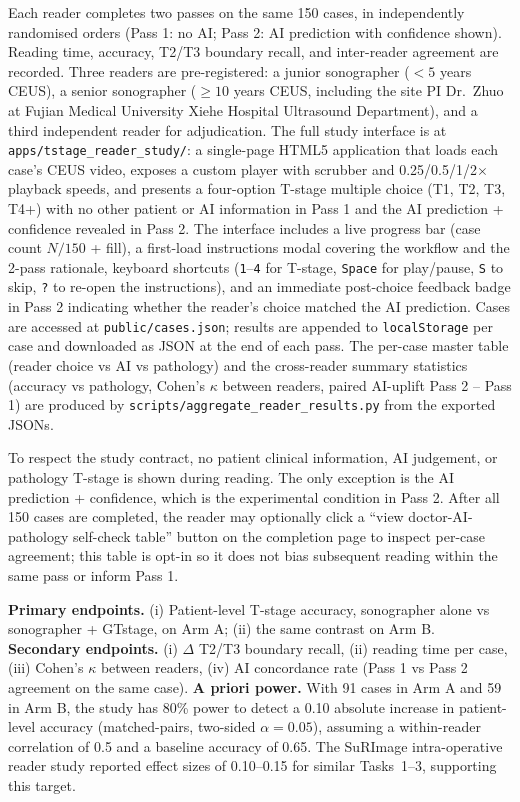 \documentclass[11pt,a4paper]{article}
\begin{document}
Each reader completes two passes on the same 150 cases, in independently randomised orders (Pass 1: no AI; Pass 2: AI prediction with confidence shown). Reading time, accuracy, T2/T3 boundary recall, and inter-reader agreement are recorded. Three readers are pre-registered: a junior sonographer ($<5$ years CEUS), a senior sonographer ($\geq 10$ years CEUS, including the site PI Dr.~Zhuo at Fujian Medical University Xiehe Hospital Ultrasound Department), and a third independent reader for adjudication. The full study interface is at \texttt{apps/tstage\_reader\_study/}: a single-page HTML5 application that loads each case's CEUS video, exposes a custom player with scrubber and 0.25/0.5/1/2$\times$ playback speeds, and presents a four-option T-stage multiple choice (T1, T2, T3, T4+) with no other patient or AI information in Pass 1 and the AI prediction + confidence revealed in Pass 2. The interface includes a live progress bar (case count $N/150$ + fill), a first-load instructions modal covering the workflow and the 2-pass rationale, keyboard shortcuts (\texttt{1}--\texttt{4} for T-stage, \texttt{Space} for play/pause, \texttt{S} to skip, \texttt{?} to re-open the instructions), and an immediate post-choice feedback badge in Pass 2 indicating whether the reader's choice matched the AI prediction. Cases are accessed at \texttt{public/cases.json}; results are appended to \texttt{localStorage} per case and downloaded as JSON at the end of each pass. The per-case master table (reader choice vs AI vs pathology) and the cross-reader summary statistics (accuracy vs pathology, Cohen's $\kappa$ between readers, paired AI-uplift Pass 2 -- Pass 1) are produced by \texttt{scripts/aggregate\_reader\_results.py} from the exported JSONs.

To respect the study contract, no patient clinical information, AI judgement, or pathology T-stage is shown during reading. The only exception is the AI prediction + confidence, which is the experimental condition in Pass 2. After all 150 cases are completed, the reader may optionally click a ``view doctor-AI-pathology self-check table'' button on the completion page to inspect per-case agreement; this table is opt-in so it does not bias subsequent reading within the same pass or inform Pass 1.

\textbf{Primary endpoints.} (i) Patient-level T-stage accuracy, sonographer alone vs sonographer + GTstage, on Arm A; (ii) the same contrast on Arm B. \textbf{Secondary endpoints.} (i) $\Delta$ T2/T3 boundary recall, (ii) reading time per case, (iii) Cohen's $\kappa$ between readers, (iv) AI concordance rate (Pass 1 vs Pass 2 agreement on the same case). \textbf{A priori power.} With 91 cases in Arm A and 59 in Arm B, the study has 80\% power to detect a 0.10 absolute increase in patient-level accuracy (matched-pairs, two-sided $\alpha=0.05$), assuming a within-reader correlation of 0.5 and a baseline accuracy of 0.65. The SuRImage intra-operative reader study \cite{ldh_surimage2026} reported effect sizes of 0.10--0.15 for similar Tasks~1--3, supporting this target.
\end{document}

